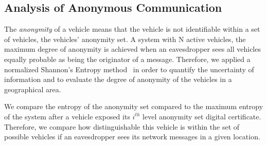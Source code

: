 \documentclass[preprint,12pt]{elsarticle}
\begin{document}
%		
%		
%	
%	
%		
%	
%

\subsection{Analysis of Anonymous Communication}
\label{sec:anonymousanalisis}

The \textit{anonymity} of a vehicle means that the vehicle is not identifiable within a set of vehicles, the vehicles' anonymity set. A system with N active vehicles, the maximum degree of anonymity is achieved when an eavesdropper sees all vehicles equally probable as being the originator of a message. Therefore, we applied a normalized Shannon's Entropy method~\cite{diaz2002information} in order to quantify the uncertainty of information and to evaluate the degree of anonymity of the vehicles in a geographical area.

We compare the entropy of the anonymity set compared to the maximum entropy of the system after a vehicle exposed its $i^{th}$ level anonymity set digital certificate. Therefore, we compare how distinguishable this vehicle is within the set of possible vehicles if an eavesdropper sees its network messages in a given location.
\end{document}
